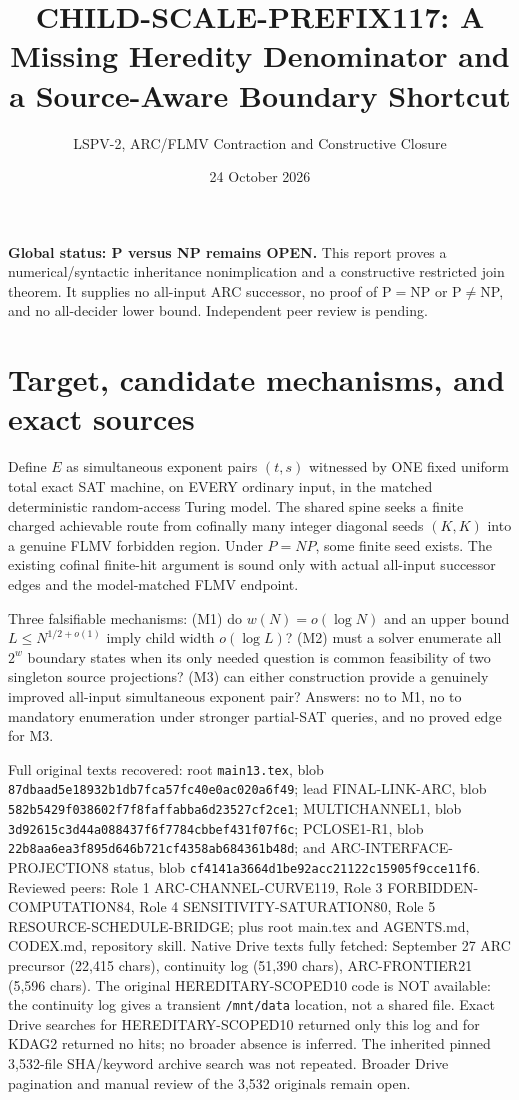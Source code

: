 \documentclass[11pt]{article}
\title{CHILD-SCALE-PREFIX117: A Missing Heredity Denominator and a Source-Aware Boundary Shortcut}
\author{LSPV-2, ARC/FLMV Contraction and Constructive Closure}
\date{24 October 2026}
\begin{document}
\maketitle
\noindent\textbf{Global status: P versus NP remains OPEN.} This report proves a numerical/syntactic inheritance nonimplication and a constructive restricted join theorem. It supplies no all-input ARC successor, no proof of P$=$NP or P$\ne$NP, and no all-decider lower bound. Independent peer review is pending.
\section{Target, candidate mechanisms, and exact sources}
Define $E$ as simultaneous exponent pairs $(t,s)$ witnessed by ONE fixed uniform total exact SAT machine, on EVERY ordinary input, in the matched deterministic random-access Turing model. The shared spine seeks a finite charged achievable route from cofinally many integer diagonal seeds $(K,K)$ into a genuine FLMV forbidden region. Under $P=NP$, some finite seed exists. The existing cofinal finite-hit argument is sound only with actual all-input successor edges and the model-matched FLMV endpoint.
\par\noindent Three falsifiable mechanisms: (M1) do $w(N)=o(\log N)$ and an upper bound $L\le N^{1/2+o(1)}$ imply child width $o(\log L)$? (M2) must a solver enumerate all $2^w$ boundary states when its only needed question is common feasibility of two singleton source projections? (M3) can either construction provide a genuinely improved all-input simultaneous exponent pair? Answers: no to M1, no to mandatory enumeration under stronger partial-SAT queries, and no proved edge for M3.
\par\noindent Full original texts recovered: root \texttt{main13.tex}, blob \texttt{87dbaad5e18932b1db7fca57fc40e0ac020a6f49}; lead FINAL-LINK-ARC, blob \texttt{582b5429f038602f7f8faffabba6d23527cf2ce1}; MULTICHANNEL1, blob \texttt{3d92615c3d44a088437f6f7784cbbef431f07f6c}; PCLOSE1-R1, blob \texttt{22b8aa6ea3f895d646b721cf4358ab684361b48d}; and ARC-INTERFACE-PROJECTION8 status, blob \texttt{cf4141a3664d1be92acc21122c15905f9cce11f6}. Reviewed peers: Role 1 ARC-CHANNEL-CURVE119, Role 3 FORBIDDEN-COMPUTATION84, Role 4 SENSITIVITY-SATURATION80, Role 5 RESOURCE-SCHEDULE-BRIDGE; plus root main.tex and AGENTS.md, CODEX.md, repository skill. Native Drive texts fully fetched: September 27 ARC precursor (22,415 chars), continuity log (51,390 chars), ARC-FRONTIER21 (5,596 chars). The original HEREDITARY-SCOPED10 code is NOT available: the continuity log gives a transient \texttt{/mnt/data} location, not a shared file. Exact Drive searches for HEREDITARY-SCOPED10 returned only this log and for KDAG2 returned no hits; no broader absence is inferred. The inherited pinned 3,532-file SHA/keyword archive search was not repeated. Broader Drive pagination and manual review of the 3,532 originals remain open.
\end{document}
